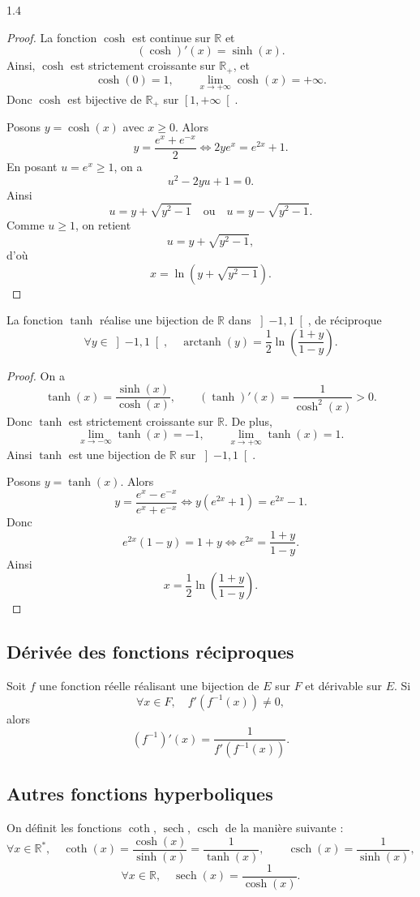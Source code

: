 \documentclass{article}
\DeclareMathOperator{\arctanh}{arctanh}
\DeclareMathOperator{\csch}{csch}
\DeclareMathOperator{\sech}{sech}
\DeclareMathOperator{\coth}{coth}
\begin{document}
\begin{spacing}{1.4}
\begin{proof}
La fonction $\cosh$ est continue sur $\mathbb{R}$ et
\[
(\cosh)'(x)=\sinh(x).
\]
Ainsi, $\cosh$ est strictement croissante sur $\mathbb{R}_+$, et
\[
\cosh(0)=1,
\qquad
\lim_{x\to +\infty}\cosh(x)=+\infty.
\]
Donc $\cosh$ est bijective de $\mathbb{R}_+$ sur $\left[1,+\infty\right[$.

Posons $y=\cosh(x)$ avec $x\ge 0$. Alors
\[
y=\frac{e^x+e^{-x}}{2}
\iff 2ye^x=e^{2x}+1.
\]
En posant $u=e^x\ge 1$, on a
\[
u^2-2yu+1=0.
\]
Ainsi
\[
u=y+\sqrt{y^2-1}
\quad\text{ou}\quad
u=y-\sqrt{y^2-1}.
\]
Comme $u\ge 1$, on retient
\[
u=y+\sqrt{y^2-1},
\]
d'où
\[
x=\ln\left(y+\sqrt{y^2-1}\right).
\]
\end{proof}

\begin{tcolorbox}[colframe=blue!75!black,colback=blue!5!white,title=Fonction réciproque de $\tanh$]
La fonction $\tanh$ réalise une bijection de $\mathbb{R}$ dans $\left]-1,1\right[$, de réciproque
\[
\forall y \in \left]-1,1\right[, \quad
\arctanh(y)=\frac12 \ln\left(\frac{1+y}{1-y}\right).
\]
\end{tcolorbox}

\begin{proof}
On a
\[
\tanh(x)=\frac{\sinh(x)}{\cosh(x)},
\qquad
(\tanh)'(x)=\frac{1}{\cosh^2(x)}>0.
\]
Donc $\tanh$ est strictement croissante sur $\mathbb{R}$.
De plus,
\[
\lim_{x\to -\infty}\tanh(x)=-1,
\qquad
\lim_{x\to +\infty}\tanh(x)=1.
\]
Ainsi $\tanh$ est une bijection de $\mathbb{R}$ sur $\left]-1,1\right[$.

Posons $y=\tanh(x)$. Alors
\[
y=\frac{e^x-e^{-x}}{e^x+e^{-x}}
\iff
y(e^{2x}+1)=e^{2x}-1.
\]
Donc
\[
e^{2x}(1-y)=1+y
\iff
e^{2x}=\frac{1+y}{1-y}.
\]
Ainsi
\[
x=\frac12\ln\left(\frac{1+y}{1-y}\right).
\]
\end{proof}

\subsection{Dérivée des fonctions réciproques}
\begin{tcolorbox}[colframe=blue!75!black,colback=blue!5!white,title=Dérivée d'une bijection réciproque]
Soit $f$ une fonction réelle réalisant une bijection de $E$ sur $F$ et dérivable sur $E$.
Si
\[
\forall x \in F,\quad f'(f^{-1}(x))\neq0,
\]
alors
\[
(f^{-1})'(x)=\frac{1}{f'(f^{-1}(x))}.
\]
\end{tcolorbox}

\subsection{Autres fonctions hyperboliques}
\begin{tcolorbox}[colframe=blue!75!black,colback=blue!5!white,title=Remarque]
On définit les fonctions $\coth$, $\sech$, $\csch$ de la manière suivante :
\[
\forall x \in \mathbb{R}^*, \quad
\coth(x)=\frac{\cosh(x)}{\sinh(x)}=\frac{1}{\tanh(x)},
\qquad
\csch(x)=\frac{1}{\sinh(x)},
\]
\[
\forall x \in \mathbb{R},\quad
\sech(x)=\frac{1}{\cosh(x)}.
\]
\end{tcolorbox}

\end{spacing}
\end{document}
